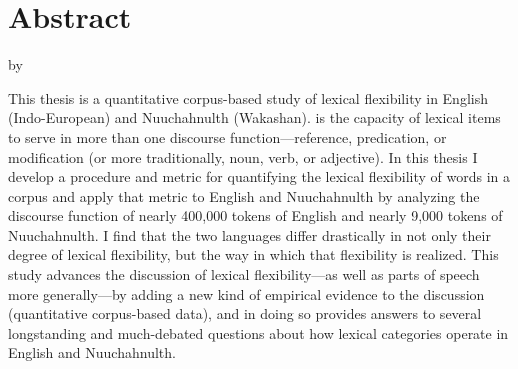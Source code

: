 \clearpage
{}
\section*{Abstract}
\label{sec:abstract}

\begin{center}

  \doctitle

  by

  \theauthor

\end{center}

This thesis is a quantitative corpus-based study of lexical flexibility in English (Indo-European) and Nuuchahnulth (Wakashan).  is the capacity of lexical items to serve in more than one discourse function---reference, predication, or modification (or more traditionally, noun, verb, or adjective). In this thesis I develop a procedure and metric for quantifying the lexical flexibility of words in a corpus and apply that metric to English and Nuuchahnulth by analyzing the discourse function of nearly 400,000 tokens of English and nearly 9,000 tokens of Nuuchahnulth. I find that the two languages differ drastically in not only their degree of lexical flexibility, but the way in which that flexibility is realized. This study advances the discussion of lexical flexibility---as well as parts of speech more generally---by adding a new kind of empirical evidence to the discussion (quantitative corpus-based data), and in doing so provides answers to several longstanding and much-debated questions about how lexical categories operate in English and Nuuchahnulth.

